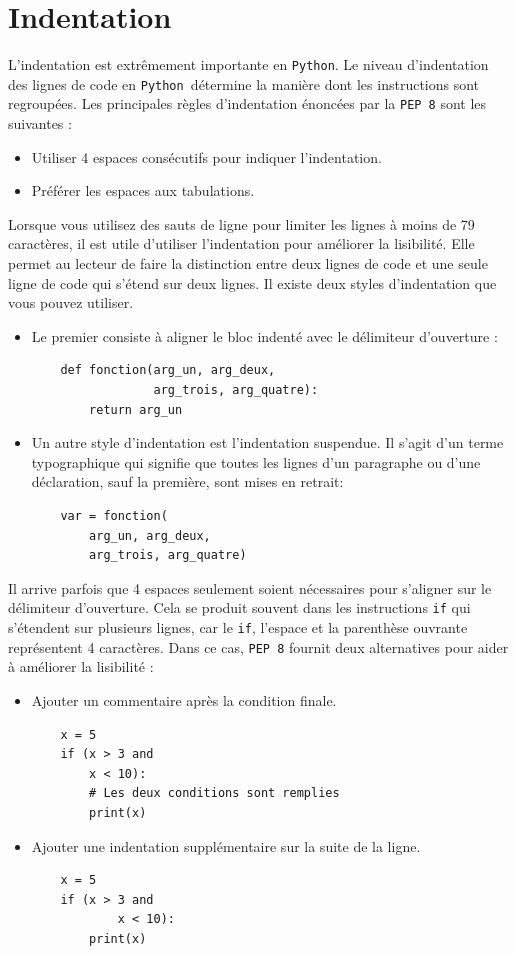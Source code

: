 \documentclass[a4paper,11pt]{book}
\begin{document}
\section{Indentation}
L'indentation est extrêmement importante en \texttt{Python}. Le niveau d'indentation des lignes de code en \texttt{Python }détermine la manière dont les instructions sont regroupées. Les principales règles d'indentation énoncées par la \texttt{PEP 8} sont les suivantes :
\begin{itemize}
	\item Utiliser 4 espaces consécutifs pour indiquer l'indentation.
	\item Préférer les espaces aux tabulations.
\end{itemize}
\medskip

Lorsque vous utilisez des sauts de ligne pour limiter les lignes à moins de 79 caractères, il est utile d'utiliser l'indentation pour améliorer la lisibilité. Elle permet au lecteur de faire la distinction entre deux lignes de code et une seule ligne de code qui s'étend sur deux lignes. Il existe deux styles d'indentation que vous pouvez utiliser.
\begin{itemize}
    \item Le premier consiste à aligner le bloc indenté avec le délimiteur d'ouverture :
    \begin{lstlisting}
    def fonction(arg_un, arg_deux,
                 arg_trois, arg_quatre):
        return arg_un
	\end{lstlisting}
	\item Un autre style d'indentation est l'indentation suspendue. Il s'agit d'un terme typographique qui signifie que toutes les lignes d'un paragraphe ou d'une déclaration, sauf la première, sont mises en retrait:
	\begin{lstlisting}
	var = fonction(
        arg_un, arg_deux,
        arg_trois, arg_quatre)
	\end{lstlisting}
\end{itemize}
\medskip

Il arrive parfois que 4 espaces seulement soient nécessaires pour s'aligner sur le délimiteur d'ouverture. Cela se produit souvent dans les instructions \texttt{if} qui s'étendent sur plusieurs lignes, car le \texttt{if}, l'espace et la parenthèse ouvrante représentent 4 caractères. Dans ce cas, \texttt{PEP 8} fournit deux alternatives pour aider à améliorer la lisibilité :
\begin{itemize}
	\item Ajouter un commentaire après la condition finale.
	\begin{lstlisting}
	x = 5
    if (x > 3 and
        x < 10):
        # Les deux conditions sont remplies
        print(x)
	\end{lstlisting}
	\item Ajouter une indentation supplémentaire sur la suite de la ligne.
	\begin{lstlisting}
	x = 5
    if (x > 3 and
            x < 10):
        print(x)
	\end{lstlisting}
\end{itemize}
\medskip
\end{document}
